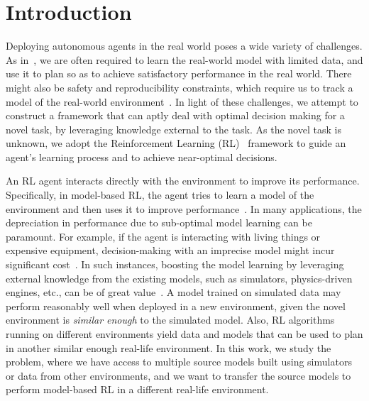 \section{Introduction}\label{sec:intro}

Deploying autonomous agents in the real world poses a wide variety of challenges. As in~\citep{dulac2021challenges}, we are often required to learn the real-world model with limited data, and use it to plan so as to achieve satisfactory performance in the real world. There might also be safety and reproducibility constraints, which require us to track a model of the real-world environment~\citep{skirzynski2021automatic}.
In light of these challenges, we attempt to construct a framework that can aptly deal with optimal decision making for a novel task, by leveraging knowledge external to the task. As the novel task is unknown, we adopt the Reinforcement Learning (RL)~\citep{Sutton2018} framework to guide an agent's learning process and to achieve near-optimal decisions.

An RL agent interacts directly with the environment to improve its performance. Specifically, in model-based RL, the agent tries to learn a model of the environment and then uses it to improve performance~\citep{moerland2020model}. In many applications, the depreciation in performance due to sub-optimal model learning can be paramount. For example, if the agent is interacting with living things or expensive equipment, decision-making with an imprecise model might incur significant cost~\citep{polydoros2017survey}. In such instances, boosting the model learning by leveraging external knowledge from the existing models, such as simulators, physics-driven engines, etc., can be of great value~\citep{taylor2008transferring}. A model trained on simulated data may perform reasonably well when deployed in a new environment, given the novel environment is \emph{similar enough} to the simulated model. 
Also, RL algorithms running on different environments yield data and models that can be used to plan in another similar enough real-life environment.
In this work, we study the problem, where we have access to multiple source models built using simulators or data from other environments, and we want to transfer the source models to perform model-based RL in a different real-life environment.

